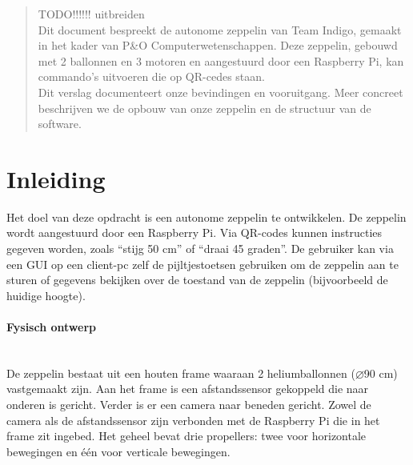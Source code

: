 \documentclass[eind]{penoverslag}
\begin{document}
\maketitlepage


\begin{abstract}
\noindent
TODO!!!!!! uitbreiden\\
Dit document bespreekt de autonome zeppelin van Team Indigo, gemaakt in het kader van P\&O Computerwetenschappen. Deze zeppelin, gebouwd met 2 ballonnen en 3 motoren en aangestuurd door een Raspberry Pi, kan commando's uitvoeren die op QR-cedes staan.\\
Dit verslag documenteert onze bevindingen en vooruitgang. Meer concreet beschrijven we de opbouw van onze zeppelin en de structuur van de software.
\end{abstract}


\tableofcontents\newpage


\section{Inleiding}
Het doel van deze opdracht is een autonome zeppelin te ontwikkelen. De zeppelin wordt aangestuurd door een Raspberry Pi. Via QR-codes kunnen instructies gegeven worden, zoals ``stijg 50 cm'' of ``draai 45   graden''. De gebruiker kan via een GUI op een client-pc zelf de pijltjestoetsen gebruiken om de zeppelin aan te sturen of gegevens bekijken over de toestand van de zeppelin (bijvoorbeeld de huidige hoogte).

\paragraph{Fysisch ontwerp}
~\\ 
De zeppelin bestaat uit een houten frame waaraan 2 heliumballonnen ($\diameter$90 cm) vastgemaakt zijn. Aan het frame is een afstandssensor gekoppeld die naar onderen is gericht. Verder is er een camera naar beneden gericht. Zowel de camera als de afstandssensor zijn verbonden met de Raspberry Pi die in het frame zit ingebed. Het geheel bevat drie propellers: twee voor horizontale bewegingen en \'{e}\'{e}n voor verticale bewegingen.
\end{document}
